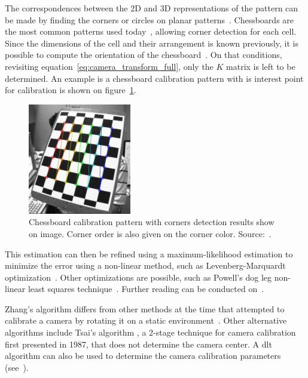The correspondences between the 2D and 3D representations of the pattern can be made by finding the corners or circles on planar patterns~\cite{opencv, mvg_book}. Chessboards are the most common patterns used today~\cite{opencv}, allowing corner detection for each cell. Since the dimensions of the cell and their arrangement is known previously, it is possible to compute the orientation of the chessboard~\cite{Zhang2000, opencv_doc, mvg_book}. On that conditions, revisiting equation~\ref{eq:camera_transform_full}, only the $K$ matrix is left to be determined. An example is a chessboard calibration pattern with is interest point for calibration is shown on figure~\ref{fig:opencv_calib_pattern}.

\begin{figure}
	\centering
	\includegraphics[width=0.4\textwidth, keepaspectratio]{img/camera/calib_pattern.jpg}
	\caption{Chessboard calibration pattern with corners detection results show on image. Corner order is also given on the corner color. Source:~\cite{OpenCV_camera_calib}.}
	\label{fig:opencv_calib_pattern}
\end{figure}

This estimation can then be refined using a maximum-likelihood estimation to minimize the error using a non-linear method, such as Levenberg-Marquardt optimization~\cite{Levenberg1943}. Other optimizations are possible, such as Powell’s dog leg non-linear least squares technique~\cite{Lourakis2005}. Further reading can be conducted on~\cite{mvg_book, Sturm2010, camera_models, Hata, Xu1996a}.

Zhang's algorithm differs from other methods at the time that attempted to calibrate a camera by rotating it on a static environment~\citeneeded. Other alternative algorithms include Tsai's algorithm \cite{Roger1987, mvg_book}, a 2-stage technique for camera calibration first presented in 1987, that does not determine the camera center. A \ac{dlt} algorithm can also be used to determine the camera calibration parameters (see~\cite{mvg_book}).

